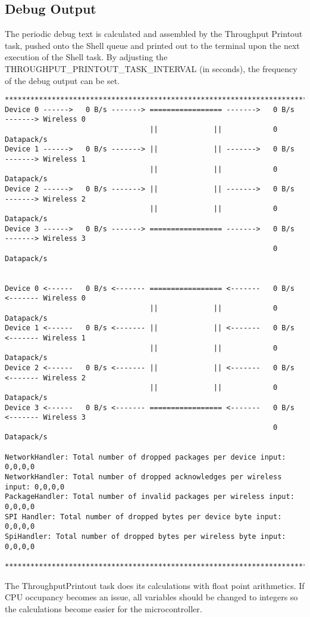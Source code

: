 \subsection{Debug Output}
The periodic debug text is calculated and assembled by the Throughput Printout task, pushed onto the Shell queue and printed out to the terminal upon the next execution of the Shell task. By adjusting the THROUGHPUT\_PRINTOUT\_TASK\_INTERVAL (in seconds), the frequency of the debug output can be set.
\begin{lstlisting}
*******************************************************************************************
Device 0 ------>   0 B/s -------> ================= ------->   0 B/s   -------> Wireless 0
                                  ||             ||            0 Datapack/s
Device 1 ------>   0 B/s -------> ||             || ------->   0 B/s   -------> Wireless 1
                                  ||             ||            0 Datapack/s
Device 2 ------>   0 B/s -------> ||             || ------->   0 B/s   -------> Wireless 2
                                  ||             ||            0 Datapack/s
Device 3 ------>   0 B/s -------> ================= ------->   0 B/s   -------> Wireless 3
                                                               0 Datapack/s


Device 0 <------   0 B/s <------- ================= <-------   0 B/s   <------- Wireless 0
                                  ||             ||            0 Datapack/s
Device 1 <------   0 B/s <------- ||             || <-------   0 B/s   <------- Wireless 1
                                  ||             ||            0 Datapack/s
Device 2 <------   0 B/s <------- ||             || <-------   0 B/s   <------- Wireless 2
                                  ||             ||            0 Datapack/s
Device 3 <------   0 B/s <------- ================= <-------   0 B/s   <------- Wireless 3
                                                               0 Datapack/s
                                                               
NetworkHandler: Total number of dropped packages per device input: 0,0,0,0
NetworkHandler: Total number of dropped acknowledges per wireless input: 0,0,0,0
PackageHandler: Total number of invalid packages per wireless input: 0,0,0,0
SPI Handler: Total number of dropped bytes per device byte input: 0,0,0,0
SpiHandler: Total number of dropped bytes per wireless byte input: 0,0,0,0

*******************************************************************************************
\end{lstlisting}
The ThroughputPrintout task does its calculations with float point arithmetics. If CPU occupancy becomes an issue, all variables should be changed to integers so the calculations become easier for the microcontroller.
%
%
